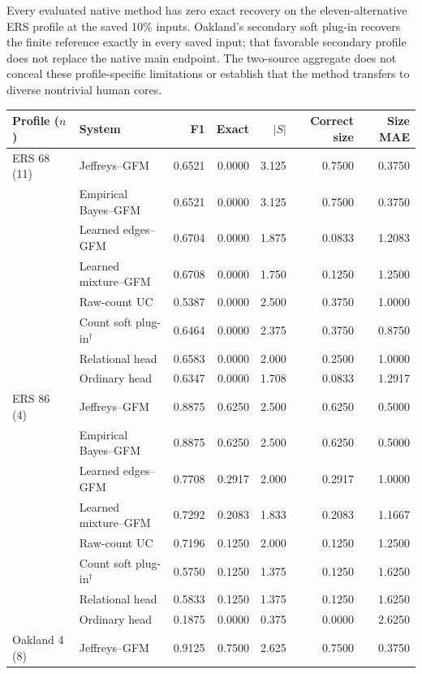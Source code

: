 Every evaluated native method has zero exact recovery on the eleven-alternative ERS profile at the saved 10\% inputs. Oakland's secondary soft plug-in recovers the finite reference exactly in every saved input; that favorable secondary profile does not replace the native main endpoint. The two-source aggregate does not conceal these profile-specific limitations or establish that the method transfers to diverse nontrivial human cores.
\begin{table}[ht]\centering\footnotesize
\begin{tabular*}{\linewidth}{@{\extracolsep{\fill}}llrrrrr@{}}\toprule
Profile ($n$) & System & F1 & Exact & $|S|$ & Correct size & Size MAE\\\midrule
ERS 68 (11) & Jeffreys--GFM & 0.6521 & 0.0000 & 3.125 & 0.7500 & 0.3750\\
 & Empirical Bayes--GFM & 0.6521 & 0.0000 & 3.125 & 0.7500 & 0.3750\\
 & Learned edges--GFM & 0.6704 & 0.0000 & 1.875 & 0.0833 & 1.2083\\
 & Learned mixture--GFM & 0.6708 & 0.0000 & 1.750 & 0.1250 & 1.2500\\
 & Raw-count UC & 0.5387 & 0.0000 & 2.500 & 0.3750 & 1.0000\\
 & Count soft plug-in$^{\dagger}$ & 0.6464 & 0.0000 & 2.375 & 0.3750 & 0.8750\\
 & Relational head & 0.6583 & 0.0000 & 2.000 & 0.2500 & 1.0000\\
 & Ordinary head & 0.6347 & 0.0000 & 1.708 & 0.0833 & 1.2917\\
\midrule
ERS 86 (4) & Jeffreys--GFM & 0.8875 & 0.6250 & 2.500 & 0.6250 & 0.5000\\
 & Empirical Bayes--GFM & 0.8875 & 0.6250 & 2.500 & 0.6250 & 0.5000\\
 & Learned edges--GFM & 0.7708 & 0.2917 & 2.000 & 0.2917 & 1.0000\\
 & Learned mixture--GFM & 0.7292 & 0.2083 & 1.833 & 0.2083 & 1.1667\\
 & Raw-count UC & 0.7196 & 0.1250 & 2.000 & 0.1250 & 1.2500\\
 & Count soft plug-in$^{\dagger}$ & 0.5750 & 0.1250 & 1.375 & 0.1250 & 1.6250\\
 & Relational head & 0.5833 & 0.1250 & 1.375 & 0.1250 & 1.6250\\
 & Ordinary head & 0.1875 & 0.0000 & 0.375 & 0.0000 & 2.6250\\
\midrule
Oakland 4 (8) & Jeffreys--GFM & 0.9125 & 0.7500 & 2.625 & 0.7500 & 0.3750\\

\end{tabular*}
\end{table}
